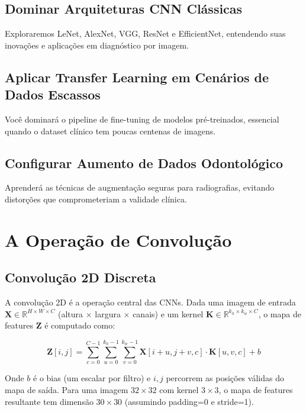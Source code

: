 \subsection{Dominar Arquiteturas CNN Clássicas}
Exploraremos LeNet, AlexNet, VGG, ResNet e EfficientNet, entendendo suas inovações e aplicações em diagnóstico por imagem.

\subsection{Aplicar Transfer Learning em Cenários de Dados Escassos}
Você dominará o pipeline de fine-tuning de modelos pré-treinados, essencial quando o dataset clínico tem poucas centenas de imagens.

\subsection{Configurar Aumento de Dados Odontológico}
Aprenderá as técnicas de augmentação seguras para radiografias, evitando distorções que comprometeriam a validade clínica.

\section{A Operação de Convolução}
\label{sec:convolucao}

\subsection{Convolução 2D Discreta}

A convolução 2D é a operação central das CNNs. Dada uma imagem de entrada
$\mathbf{X} \in \mathbb{R}^{H \times W \times C}$ (altura $\times$ largura
$\times$ canais) e um kernel $\mathbf{K} \in \mathbb{R}^{k_h \times k_w \times C}$,
o mapa de features $\mathbf{Z}$ é computado como:

\begin{equation}
  \mathbf{Z}[i, j] = \sum_{c=0}^{C-1} \sum_{u=0}^{k_h-1} \sum_{v=0}^{k_w-1}
    \mathbf{X}[i+u, j+v, c] \cdot \mathbf{K}[u, v, c] + b
  \label{eq:conv2d}
\end{equation}

Onde $b$ é o bias (um escalar por filtro) e $i, j$ percorrem as posições válidas
do mapa de saída. Para uma imagem $32 \times 32$ com kernel $3 \times 3$, o mapa
de features resultante tem dimensão $30 \times 30$ (assumindo padding=0 e stride=1).

